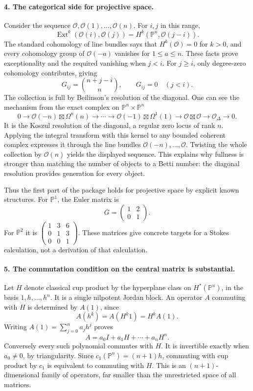 \documentclass[11pt]{article}
\begin{document}
\paragraph{4. The categorical side for projective space.}
Consider the sequence $\mathcal O,\mathcal O(1),\ldots,\mathcal O(n)$. For $i,j$ in this range,
\[
 \operatorname{Ext}^k(\mathcal O(i),\mathcal O(j))
 =H^k(\mathbb P^n,\mathcal O(j-i)).
\]
The standard cohomology of line bundles says that $H^k(\mathcal O)=0$ for $k>0$, and every cohomology group of $\mathcal O(-a)$ vanishes for $1\leq a\leq n$. These facts prove exceptionality and the required vanishing when $j<i$. For $j\geq i$, only degree-zero cohomology contributes, giving
\[
 G_{ij}={n+j-i\choose n},\qquad G_{ij}=0\quad(j<i).
\]
The collection is full by Beilinson's resolution of the diagonal. One can see the mechanism from the exact complex on $\mathbb P^n\times\mathbb P^n$
\[
 0\to\mathcal O(-n)\boxtimes\Omega^n(n)\to\cdots
 \to\mathcal O(-1)\boxtimes\Omega^1(1)
 \to\mathcal O\boxtimes\mathcal O\to\mathcal O_\Delta\to0.
\]
It is the Koszul resolution of the diagonal, a regular zero locus of rank $n$. Applying the integral transform with this kernel to any bounded coherent complex expresses it through the line bundles $\mathcal O(-n),\ldots,\mathcal O$. Twisting the whole collection by $\mathcal O(n)$ yields the displayed sequence. This explains why fullness is stronger than matching the number of objects to a Betti number: the diagonal resolution provides generation for every object.

Thus the first part of the package holds for projective space by explicit known structures. For $\mathbb P^1$, the Euler matrix is
\[
 G=\begin{pmatrix}1&2\\0&1\end{pmatrix}.
\]
For $\mathbb P^2$ it is $\left(\begin{smallmatrix}1&3&6\\0&1&3\\0&0&1\end{smallmatrix}\right)$. These matrices give concrete targets for a Stokes calculation, not a derivation of that calculation.

\paragraph{5. The commutation condition on the central matrix is substantial.}
Let $H$ denote classical cup product by the hyperplane class on $H^*(\mathbb P^n)$, in the basis $1,h,\ldots,h^n$. It is a single nilpotent Jordan block. An operator $A$ commuting with $H$ is determined by $A(1)$, since
\[
 A(h^k)=A(H^k1)=H^kA(1).
\]
Writing $A(1)=\sum_{j=0}^n a_jh^j$ proves
\[
 A=a_0I+a_1H+\cdots+a_nH^n.
\]
Conversely every such polynomial commutes with $H$. It is invertible exactly when $a_0\ne0$, by triangularity. Since $c_1(\mathbb P^n)=(n+1)h$, commuting with cup product by $c_1$ is equivalent to commuting with $H$. This is an $(n+1)$-dimensional family of operators, far smaller than the unrestricted space of all matrices.
\end{document}
